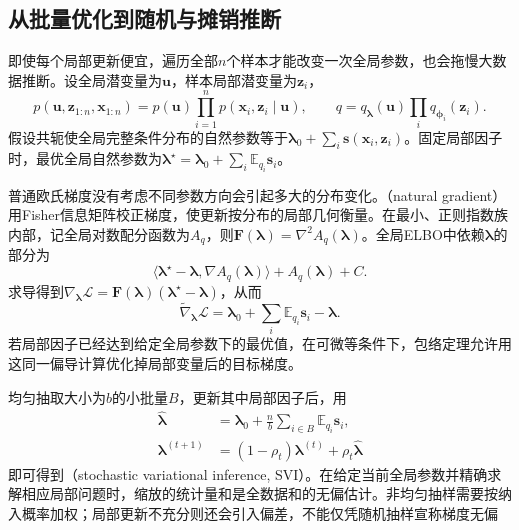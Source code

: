 \subsection{从批量优化到随机与摊销推断}
\label{sec:pgm-variational-stochastic-amortized}
\label{sec:pgm-variational-scalable}
\label{sec:pgm-variational-svi}

即使每个局部更新便宜，遍历全部$n$个样本才能改变一次全局参数，也会拖慢大数据推断。设全局潜变量为$\bm u$，样本局部潜变量为$\bm z_i$，
\[
  p(\bm u,\bm z_{1:n},\bm x_{1:n})
    =p(\bm u)\prod_{i=1}^n p(\bm x_i,\bm z_i\mid\bm u),
  \qquad
  q=q_{\bm{\lambda}}(\bm u)\prod_iq_{\bm{\phi}_i}(\bm z_i).
\]
假设共轭使全局完整条件分布的自然参数等于$\bm{\lambda}_0+\sum_i\bm s(\bm x_i,\bm z_i)$。固定局部因子时，最优全局自然参数为$\bm{\lambda}^\star=\bm{\lambda}_0+\sum_i\mathbb E_{q_i}\bm s_i$。

普通欧氏梯度没有考虑不同参数方向会引起多大的分布变化。（natural gradient）用Fisher信息矩阵校正梯度，使更新按分布的局部几何衡量。在最小、正则指数族内部，记全局对数配分函数为$A_q$，则$\bm F(\bm{\lambda})=\nabla^2 A_q(\bm{\lambda})$。全局ELBO中依赖$\bm{\lambda}$的部分为
\[
  \langle\bm{\lambda}^\star-\bm{\lambda},
            \nabla A_q(\bm{\lambda})\rangle+A_q(\bm{\lambda})+C.
\]
求导得到$\nabla_{\bm{\lambda}}\mathcal L=\bm F(\bm{\lambda})(\bm{\lambda}^\star-\bm{\lambda})$，从而
\begin{equation}
  \widetilde\nabla_{\bm{\lambda}}\mathcal L
    =\bm{\lambda}_0+\sum_i\mathbb E_{q_i}\bm s_i-\bm{\lambda}.
  \label{eq:pgm-variational-natural-gradient}
\end{equation}
若局部因子已经达到给定全局参数下的最优值，在可微等条件下，包络定理允许用这同一偏导计算优化掉局部变量后的目标梯度。

均匀抽取大小为$b$的小批量$B$，更新其中局部因子后，用
\begin{equation}
  \begin{aligned}
    \widehat{\bm{\lambda}}
      &=\bm{\lambda}_0+\frac{n}{b}
           \sum_{i\in B}\mathbb E_{q_i}\bm s_i,\\
    \bm{\lambda}^{(t+1)}
      &=(1-\rho_t)\bm{\lambda}^{(t)}
          +\rho_t\widehat{\bm{\lambda}}
  \end{aligned}
  \label{eq:pgm-variational-svi}
\end{equation}
即可得到（stochastic variational inference, SVI）。在给定当前全局参数并精确求解相应局部问题时，缩放的统计量和是全数据和的无偏估计。非均匀抽样需要按纳入概率加权；局部更新不充分则还会引入偏差，不能仅凭随机抽样宣称梯度无偏


